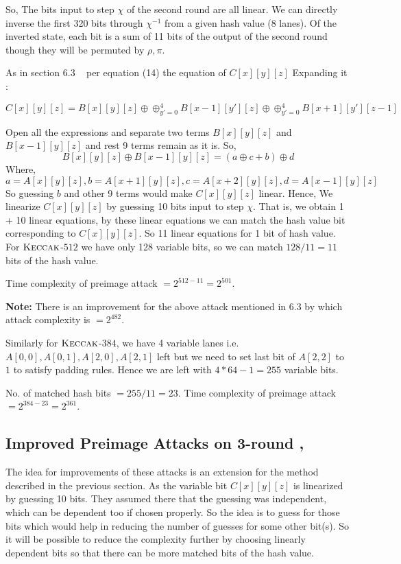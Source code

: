         So, The bits input to step $\chi$ of the second round are all linear. We can directly inverse the first 320 bits through $\chi^{-1}$ from a given hash value (8 lanes). Of the inverted state, each bit is a sum of 11 bits of the output of the second round though they will be permuted by $\rho, \pi$.

    As in section 6.3 ~\cite{guo2016linear} per equation (14) the equation of $C[x][y][z]$
    Expanding it :

    \[
        C[x][y][z] = B[x][y][z] \oplus \oplus_{y' = 0}^{4} B[x-1][y'][z] \oplus \oplus_{y' = 0}^{4} B[x+1][y'][z-1]
    \]
    
        Open all the expressions and separate two terms $B[x][y][z]$ and $B[x-1][y][z]$ and rest 9 terms remain as it is.
    So, 
        \[ B[x][y][z] \oplus B[x-1][y][z] = (a \oplus c + b) \oplus d
    \]
    Where,
         \[
        a = A[x][y][z], b = A[x + 1][y][z], c = A[x + 2][y][z], d = A[x - 1][y][z]
    \]
    So guessing $b$ and other 9 terms would make $C[x][y][z]$ linear. Hence, We linearize $C[x][y][z]$ by guessing 10 bits input to step $\chi$. That is, we obtain 1 + 10 linear equations, by these linear equations we can match the hash value bit corresponding to $C[x][y][z]$. So 11 linear equations for 1 bit of hash value. For $\mbox{\textsc{Keccak}}$-$512$ we have only 128 variable bits, so we can match $128/11 = 11$ bits of the hash value.
    
    Time complexity of preimage attack $= 2^{512 - 11} = 2^{501}$.

    \textbf{Note:} There is an improvement for the above attack mentioned in 6.3 by which attack complexity is $= 2^{482}$.

    Similarly for $\mbox{\textsc{Keccak}}$-$384$, we have 4 variable lanes i.e. $A[0,0], A[0,1], A[2,0], A[2,1]$ left but we need to set last bit of $A[2,2]$ to $1$ to satisfy padding rules. Hence we are left with $4*64 - 1 = 255$ variable bits.
    
    No. of matched hash bits $ = 255/11 = 23 $. Time complexity of preimage attack $= 2^{384 - 23} = 2^{361}$.

\subsection{Improved Preimage Attacks on 3-round , }

    The idea for improvements of these attacks is an extension for the method described in the previous section. As the variable bit $C[x][y][z]$ is linearized by guessing 10 bits. They assumed there that the guessing was independent, which can be dependent too if chosen properly. So the idea is to guess for those bits which would help in reducing the number of guesses for some other bit(s). So it will be possible to reduce the complexity further by choosing linearly dependent bits so that there can be more matched bits of the hash value.

